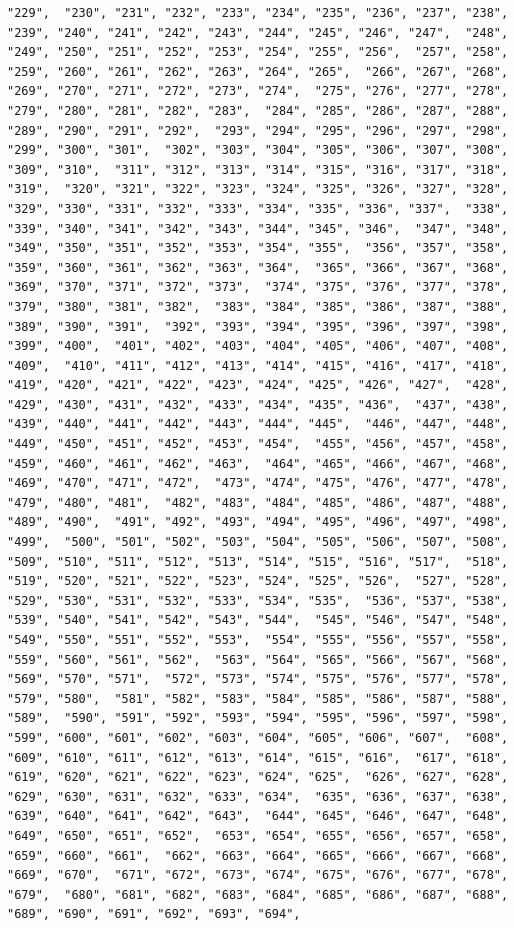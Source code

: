 \documentclass[
]{article}
\begin{document}
\begin{verbatim}
"229",  "230", "231", "232", "233", "234", "235", "236", "237", "238",  "239", "240", "241", "242", "243", "244", "245", "246", "247",  "248", "249", "250", "251", "252", "253", "254", "255", "256",  "257", "258", "259", "260", "261", "262", "263", "264", "265",  "266", "267", "268", "269", "270", "271", "272", "273", "274",  "275", "276", "277", "278", "279", "280", "281", "282", "283",  "284", "285", "286", "287", "288", "289", "290", "291", "292",  "293", "294", "295", "296", "297", "298", "299", "300", "301",  "302", "303", "304", "305", "306", "307", "308", "309", "310",  "311", "312", "313", "314", "315", "316", "317", "318", "319",  "320", "321", "322", "323", "324", "325", "326", "327", "328",  "329", "330", "331", "332", "333", "334", "335", "336", "337",  "338", "339", "340", "341", "342", "343", "344", "345", "346",  "347", "348", "349", "350", "351", "352", "353", "354", "355",  "356", "357", "358", "359", "360", "361", "362", "363", "364",  "365", "366", "367", "368", "369", "370", "371", "372", "373",  "374", "375", "376", "377", "378", "379", "380", "381", "382",  "383", "384", "385", "386", "387", "388", "389", "390", "391",  "392", "393", "394", "395", "396", "397", "398", "399", "400",  "401", "402", "403", "404", "405", "406", "407", "408", "409",  "410", "411", "412", "413", "414", "415", "416", "417", "418",  "419", "420", "421", "422", "423", "424", "425", "426", "427",  "428", "429", "430", "431", "432", "433", "434", "435", "436",  "437", "438", "439", "440", "441", "442", "443", "444", "445",  "446", "447", "448", "449", "450", "451", "452", "453", "454",  "455", "456", "457", "458", "459", "460", "461", "462", "463",  "464", "465", "466", "467", "468", "469", "470", "471", "472",  "473", "474", "475", "476", "477", "478", "479", "480", "481",  "482", "483", "484", "485", "486", "487", "488", "489", "490",  "491", "492", "493", "494", "495", "496", "497", "498", "499",  "500", "501", "502", "503", "504", "505", "506", "507", "508",  "509", "510", "511", "512", "513", "514", "515", "516", "517",  "518", "519", "520", "521", "522", "523", "524", "525", "526",  "527", "528", "529", "530", "531", "532", "533", "534", "535",  "536", "537", "538", "539", "540", "541", "542", "543", "544",  "545", "546", "547", "548", "549", "550", "551", "552", "553",  "554", "555", "556", "557", "558", "559", "560", "561", "562",  "563", "564", "565", "566", "567", "568", "569", "570", "571",  "572", "573", "574", "575", "576", "577", "578", "579", "580",  "581", "582", "583", "584", "585", "586", "587", "588", "589",  "590", "591", "592", "593", "594", "595", "596", "597", "598",  "599", "600", "601", "602", "603", "604", "605", "606", "607",  "608", "609", "610", "611", "612", "613", "614", "615", "616",  "617", "618", "619", "620", "621", "622", "623", "624", "625",  "626", "627", "628", "629", "630", "631", "632", "633", "634",  "635", "636", "637", "638", "639", "640", "641", "642", "643",  "644", "645", "646", "647", "648", "649", "650", "651", "652",  "653", "654", "655", "656", "657", "658", "659", "660", "661",  "662", "663", "664", "665", "666", "667", "668", "669", "670",  "671", "672", "673", "674", "675", "676", "677", "678", "679",  "680", "681", "682", "683", "684", "685", "686", "687", "688",  "689", "690", "691", "692", "693", "694", 
\end{verbatim}
\end{document}

